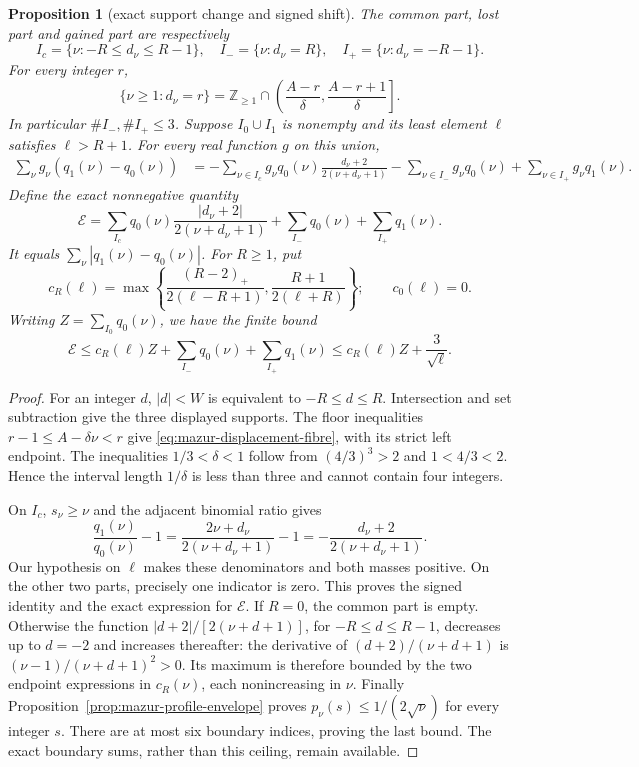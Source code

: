 \documentclass[11pt]{article}
\newtheorem{proposition}{Proposition}
\theoremstyle{remark}\newtheorem{remark}[proposition]{Remark}
\begin{document}
\begin{proposition}[exact support change and signed shift]
\label{prop:mazur-shift-support}
The common part, lost part and gained part are respectively
\[
 I_c=\{\nu:-R\le d_\nu\le R-1\},\quad
 I_-=\{\nu:d_\nu=R\},\quad I_+=\{\nu:d_\nu=-R-1\}.
\]
For every integer $r$,
\begin{equation}
 \{\nu\ge1:d_\nu=r\}
 =\mathbb Z_{\ge1}\cap
       \left(\frac{A-r}{\delta},\frac{A-r+1}{\delta}\right].
 \label{eq:mazur-displacement-fibre}
\end{equation}
In particular $\#I_-,\#I_+\le3$. Suppose $I_0\cup I_1$ is nonempty
and its least element $\ell$ satisfies $\ell>R+1$. For every real
function $g$ on this union,
\begin{align}
 \sum_\nu g_\nu(q_1(\nu)-q_0(\nu))
 &=-\sum_{\nu\in I_c}g_\nu q_0(\nu)
       \frac{d_\nu+2}{2(\nu+d_\nu+1)}
       -\sum_{\nu\in I_-}g_\nu q_0(\nu)
       +\sum_{\nu\in I_+}g_\nu q_1(\nu).
 \label{eq:mazur-shift-signed}
\end{align}
Define the exact nonnegative quantity
\[
 \mathcal E=
 \sum_{I_c}q_0(\nu)\frac{|d_\nu+2|}{2(\nu+d_\nu+1)}
       +\sum_{I_-}q_0(\nu)+\sum_{I_+}q_1(\nu).
\]
It equals $\sum_\nu|q_1(\nu)-q_0(\nu)|$. For $R\ge1$, put
\[
 c_R(\ell)=\max\left\{
 \frac{(R-2)_+}{2(\ell-R+1)},
 \frac{R+1}{2(\ell+R)}\right\};
 \qquad c_0(\ell)=0 .
\]
Writing $Z=\sum_{I_0}q_0(\nu)$, we have the finite bound
\begin{equation}
 \mathcal E\le c_R(\ell)Z+
       \sum_{I_-}q_0(\nu)+\sum_{I_+}q_1(\nu)
       \le c_R(\ell)Z+\frac3{\sqrt\ell}.
 \label{eq:mazur-shift-envelope}
\end{equation}
\end{proposition}
\begin{proof}
For an integer $d$, $|d|<W$ is equivalent to $-R\le d\le R$.
Intersection and set subtraction give the three displayed supports.
The floor inequalities $r-1\le A-\delta\nu<r$ give
\eqref{eq:mazur-displacement-fibre}, with its strict left endpoint.
The inequalities $1/3<\delta<1$ follow from
$(4/3)^3>2$ and $1<4/3<2$. Hence the interval length $1/\delta$
is less than three and cannot contain four integers.

On $I_c$, $s_\nu\ge\nu$ and the adjacent binomial ratio gives
\[
 \frac{q_1(\nu)}{q_0(\nu)}-1
 =\frac{2\nu+d_\nu}{2(\nu+d_\nu+1)}-1
 =-\frac{d_\nu+2}{2(\nu+d_\nu+1)} .
\]
Our hypothesis on $\ell$ makes these denominators and both masses
positive. On the other two parts, precisely one indicator is zero.
This proves the signed identity and the exact expression for
$\mathcal E$. If $R=0$, the common part is empty.
Otherwise the function $|d+2|/[2(\nu+d+1)]$, for
$-R\le d\le R-1$, decreases up to $d=-2$ and increases thereafter:
the derivative of $(d+2)/(\nu+d+1)$ is
$(\nu-1)/(\nu+d+1)^2>0$. Its maximum is therefore bounded by the
two endpoint expressions in $c_R(\nu)$, each nonincreasing in $\nu$.
Finally Proposition~\ref{prop:mazur-profile-envelope} proves
$p_\nu(s)\le1/(2\sqrt\nu)$ for every integer $s$.
There are at most six boundary indices, proving the last bound.
The exact boundary sums, rather than this ceiling, remain available.
\end{proof}
\end{document}
